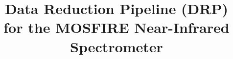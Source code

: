 \documentclass[a4paper]{article}
\begin{document}
\title{Data Reduction Pipeline (DRP) for the MOSFIRE Near-Infrared Spectrometer}



\maketitle













\end{document}

